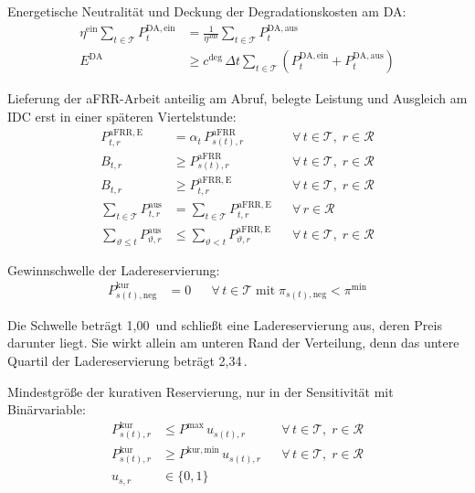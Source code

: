 Energetische Neutralität und Deckung der Degradationskosten am \acs{DA}:
\begin{align}
    \eta^{\mathrm{ein}} \sum_{t \in \mathcal{T}} P^{\mathrm{DA,ein}}_t &= \frac{1}{\eta^{\mathrm{aus}}} \sum_{t \in \mathcal{T}} P^{\mathrm{DA,aus}}_t \label{eq:anh:modell:da_neutral}\\
    E^{\mathrm{DA}} &\ge c^{\mathrm{deg}} \, \Delta t \sum_{t \in \mathcal{T}} \left( P^{\mathrm{DA,ein}}_t + P^{\mathrm{DA,aus}}_t \right) \label{eq:anh:modell:da_deckung}
\end{align}

Lieferung der \acs{aFRR}-Arbeit anteilig am Abruf, belegte Leistung und Ausgleich am \acs{IDC} erst in einer späteren Viertelstunde:
\begin{align}
    P^{\mathrm{aFRR,E}}_{t,r} &= \alpha_t \, P^{\mathrm{aFRR}}_{s(t),r} && \forall\, t \in \mathcal{T}, \; r \in \mathcal{R} \label{eq:anh:modell:afrr_menge}\\
    B_{t,r} &\ge P^{\mathrm{aFRR}}_{s(t),r} && \forall\, t \in \mathcal{T}, \; r \in \mathcal{R} \label{eq:anh:modell:afrr_band_res}\\
    B_{t,r} &\ge P^{\mathrm{aFRR,E}}_{t,r} && \forall\, t \in \mathcal{T}, \; r \in \mathcal{R} \label{eq:anh:modell:afrr_band_lief}\\
    \sum_{t \in \mathcal{T}} P^{\mathrm{aus}}_{t,r} &= \sum_{t \in \mathcal{T}} P^{\mathrm{aFRR,E}}_{t,r} && \forall\, r \in \mathcal{R} \label{eq:anh:modell:aus_bilanz}\\
    \sum_{\vartheta \le t} P^{\mathrm{aus}}_{\vartheta,r} &\le \sum_{\vartheta < t} P^{\mathrm{aFRR,E}}_{\vartheta,r} && \forall\, t \in \mathcal{T}, \; r \in \mathcal{R} \label{eq:anh:modell:aus_kausal}
\end{align}

Gewinnschwelle der Ladereservierung:
\begin{align}
    P^{\mathrm{kur}}_{s(t),\mathrm{neg}} &= 0 && \forall\, t \in \mathcal{T} \;\text{mit}\; \pi_{s(t),\mathrm{neg}} < \pi^{\min} \label{eq:anh:modell:kur_schwelle}
\end{align}

Die Schwelle beträgt 1,00\,\EurMWh{} und schließt eine Ladereservierung aus, deren Preis darunter liegt.
Sie wirkt allein am unteren Rand der Verteilung, denn das untere Quartil der Ladereservierung beträgt 2,34\,\EurMWh{}.

Mindestgröße der kurativen Reservierung, nur in der Sensitivität mit Binärvariable:
\begin{align}
    P^{\mathrm{kur}}_{s(t),r} &\le P^{\max} \, u_{s(t),r} && \forall\, t \in \mathcal{T}, \; r \in \mathcal{R} \label{eq:anh:modell:kur_oben}\\
    P^{\mathrm{kur}}_{s(t),r} &\ge P^{\mathrm{kur,min}} \, u_{s(t),r} && \forall\, t \in \mathcal{T}, \; r \in \mathcal{R} \label{eq:anh:modell:kur_min}\\
    u_{s,r} &\in \{0, 1\} \label{eq:anh:modell:kur_binaer}
\end{align}

